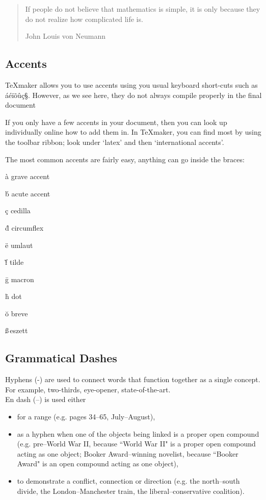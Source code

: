 \documentclass[a4paper,11pt]{article}
\begin{document}
\begin{quote}
 If people do not believe that mathematics is simple, it is only because they do not realize how complicated life is. 
\begin{flushright} John Louis von Neumann \end{flushright}
\end{quote}




\subsection{Accents}

TeXmaker allows you to use accents using you usual keyboard short-cuts such as áéïõûç§.  %
However, as we see here, they do not always compile properly in the final document

If you only have a few accents in your document, then you can look up individually online how to add them in. In TeXmaker, you can find most by using the toolbar ribbon; look under `latex' and then `international accents'.

The most common accents are fairly easy, anything can go inside the braces:

\`{a}  grave accent

\'{b}  acute accent

\c{c}  cedilla

\^{d}  circumflex

\"{e}  umlaut

\~{f}  tilde

\={g}  macron

\.{h}  dot

\u{o}  breve

\ss    \,eszett


\pagebreak






\subsection{Grammatical Dashes}

Hyphens (-) are used to connect words that function together as a single concept. For example, two-thirds, eye-opener, state-of-the-art.\\

\noindent En dash (--) is used either
\begin{itemize}
\item for a range (e.g. pages 34--65, July--August),
\item as a hyphen when one of the objects being linked is a proper open compound  (e.g. pre--World War II, because ``World War II" is a proper open compound  acting as one object; Booker Award--winning novelist, because ``Booker Award"  is an open compound acting as one object),
\item to demonstrate a conflict, connection or direction  (e.g. the north--south divide, the London--Manchester train, the  liberal--conservative coalition).
\end{itemize}
\end{document}
